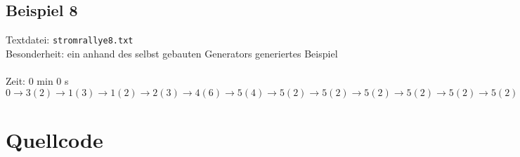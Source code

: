 \documentclass[a4paper,10pt,ngerman]{scrartcl}
\begin{document}
\subsection{Beispiel 8}\label{example:8}
Textdatei: \texttt{stromrallye8.txt}\\
Besonderheit: ein anhand des selbst gebauten Generators generiertes Beispiel\\

\noindent
{}\\

\noindent
Zeit: 0 min 0 s\\

\noindent
$0 \rightarrow3(2) \rightarrow 1(3) \rightarrow 1(2) \rightarrow 2(3) \rightarrow 4(6) \rightarrow 5(4) \rightarrow 5(2) \rightarrow 5(2)
\rightarrow 5(2) \rightarrow 5(2) \rightarrow 5(2) \rightarrow 5(2) \rightarrow 5(2) \rightarrow 5(2)$


\newpage
\section{Quellcode}

\end{document}
